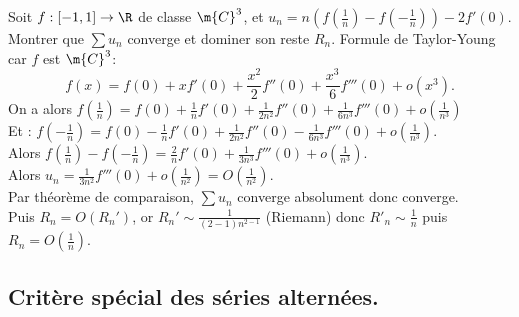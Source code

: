 \documentclass[11pt]{article}
\begin{document}
\begin{ex}{}{}
    Soit $f:[-1,1]\to\R$ de classe $\m{C}^3$, et $u_n=n\left( f\left( \frac{1}{n} \right) - f\left( -\frac{1}{n} \right) \right)-2f'(0)$.\\
    Montrer que $\sum u_n$ converge et dominer son reste $R_n$.
    \tcblower
    Formule de Taylor-Young car $f$ est $\m{C}^3$:
    \begin{equation*}
        f(x)=f(0)+xf'(0)+\frac{x^2}{2}f''(0)+\frac{x^3}{6}f'''(0) + o(x^3).
    \end{equation*}
    On a alors $f\left( \frac{1}{n} \right) = f(0)+\frac{1}{n}f'(0)+\frac{1}{2n^2}f''(0)+\frac{1}{6n^3}f'''(0)+o(\frac{1}{n^3})$\\
    Et : $f\left( -\frac{1}{n} \right) = f(0)-\frac{1}{n}f'(0)+\frac{1}{2n^2}f''(0)-\frac{1}{6n^3}f'''(0)+o(\frac{1}{n^3})$.\\
    Alors $f\left( \frac{1}{n} \right) - f\left( -\frac{1}{n} \right) = \frac{2}{n}f'(0) + \frac{1}{3n^3}f'''(0)+o(\frac{1}{n^3})$.\\
    Alors $u_n = \frac{1}{3n^2}f'''(0)+o\left( \frac{1}{n^2} \right) = O\left( \frac{1}{n^2} \right)$.\\
    Par théorème de comparaison, $\sum u_n$ converge absolument donc converge.\\
    Puis $R_n=O(R_n')$, or $R_n'\sim\frac{1}{(2-1)n^{2-1}}$ (Riemann) donc $R'_n\sim\frac{1}{n}$ puis $R_n=O(\frac{1}{n})$.
\end{ex}

\vspace*{-0.7cm}

\subsection{Critère spécial des séries alternées.}
\end{document}
